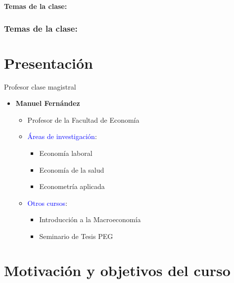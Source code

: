 \documentclass[10pt, xcolor=dvipsnames]{beamer}
\subtitle{Introducción, programa y estructura del curso}
\begin{document}
	\beamertemplatenavigationsymbolsempty	
\begin{frame}[plain]%
	\titlepage
	\vspace{-0.4cm}
\textbf{Temas de la clase:} \\ \vspace{0.3cm}
	\tableofcontents
\end{frame}

\begin{frame}\frametitle{Temas de la clase:}
	\tableofcontents
\end{frame}

\section{Presentación}

\begin{frame}{Profesor clase magistral}
\begin{itemize}
    \item \textbf{Manuel Fernández} \vspace{0.1cm}
    \begin{itemize}
        \item Profesor de la Facultad de Economía
        \item \textcolor{blue}{Áreas de investigación}:
        \begin{itemize}
            \item Economía laboral
            \item Economía de la salud
            \item Econometría aplicada
        \end{itemize}
        \item \textcolor{blue}{Otros cursos}:
        \begin{itemize}
            \item Introducción a la Macroeconomía
            \item Seminario de Tesis PEG
        \end{itemize}
    \end{itemize}
\end{itemize}
\end{frame}

\section{Motivación y objetivos del curso}
 
\end{document}
